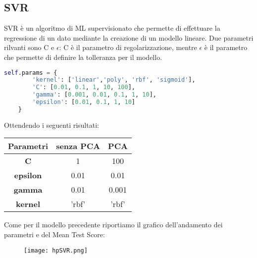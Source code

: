 \documentclass[../../Report.tex]{subfiles}
\begin{document}
\subsection{SVR}
SVR è un algoritmo di ML supervisionato che permette di effettuare la regressione di un dato mediante la creazione di un modello lineare.
Due parametri rilvanti sono C e $\epsilon$: C è il parametro di regolarizzazione, mentre $\epsilon$ è il parametro che permette di definire la tolleranza per il modello.
\begin{lstlisting}[language=Python]
    self.params = {
        'kernel': ['linear','poly', 'rbf', 'sigmoid'],
        'C': [0.01, 0.1, 1, 10, 100],
        'gamma': [0.001, 0.01, 0.1, 1, 10],
        'epsilon': [0.01, 0.1, 1, 10]
    }
\end{lstlisting}
Ottendendo i seguenti risultati:
\begin{table}[H]
    \centering
    \begin{tabular}{|c|c|c|}
    \hline
    \textbf{Parametri} & \textbf{senza PCA} & \textbf{PCA} \\ \hline
    \textbf{C}& 1 & 100\\
    \textbf{epsilon}& 0.01 &  0.01 \\
    \textbf{gamma}& 0.01 & 0.001\\
    \textbf{kernel}& 'rbf' &  'rbf'\\
    \hline
\end{tabular}
\end{table}
Come per il modello precedente riportiamo il grafico dell'andamento dei parametri e del Mean Test Score:
\begin{figure}[H]
    \centering
    \texttt{[image: hpSVR.png]}
\end{figure}
\end{document}
